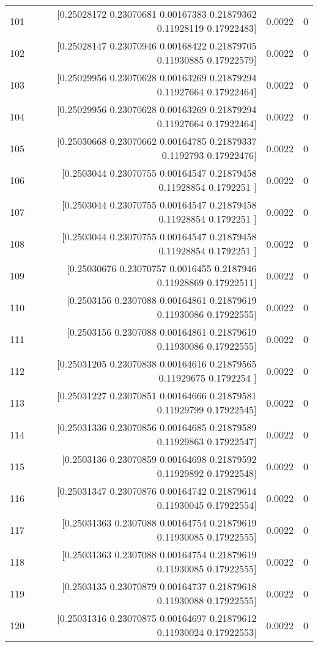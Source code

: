 \begin{longtable}{lrrr}
101 & [0.25028172 0.23070681 0.00167383 0.21879362 0.11928119 0.17922483] & 0.0022 & 0 \\
102 & [0.25028147 0.23070946 0.00168422 0.21879705 0.11930885 0.17922579] & 0.0022 & 0 \\
103 & [0.25029956 0.23070628 0.00163269 0.21879294 0.11927664 0.17922464] & 0.0022 & 0 \\
104 & [0.25029956 0.23070628 0.00163269 0.21879294 0.11927664 0.17922464] & 0.0022 & 0 \\
105 & [0.25030668 0.23070662 0.00164785 0.21879337 0.1192793  0.17922476] & 0.0022 & 0 \\
106 & [0.2503044  0.23070755 0.00164547 0.21879458 0.11928854 0.1792251 ] & 0.0022 & 0 \\
107 & [0.2503044  0.23070755 0.00164547 0.21879458 0.11928854 0.1792251 ] & 0.0022 & 0 \\
108 & [0.2503044  0.23070755 0.00164547 0.21879458 0.11928854 0.1792251 ] & 0.0022 & 0 \\
109 & [0.25030676 0.23070757 0.0016455  0.2187946  0.11928869 0.17922511] & 0.0022 & 0 \\
110 & [0.2503156  0.2307088  0.00164861 0.21879619 0.11930086 0.17922555] & 0.0022 & 0 \\
111 & [0.2503156  0.2307088  0.00164861 0.21879619 0.11930086 0.17922555] & 0.0022 & 0 \\
112 & [0.25031205 0.23070838 0.00164616 0.21879565 0.11929675 0.1792254 ] & 0.0022 & 0 \\
113 & [0.25031227 0.23070851 0.00164666 0.21879581 0.11929799 0.17922545] & 0.0022 & 0 \\
114 & [0.25031336 0.23070856 0.00164685 0.21879589 0.11929863 0.17922547] & 0.0022 & 0 \\
115 & [0.2503136  0.23070859 0.00164698 0.21879592 0.11929892 0.17922548] & 0.0022 & 0 \\
116 & [0.25031347 0.23070876 0.00164742 0.21879614 0.11930045 0.17922554] & 0.0022 & 0 \\
117 & [0.25031363 0.2307088  0.00164754 0.21879619 0.11930085 0.17922555] & 0.0022 & 0 \\
118 & [0.25031363 0.2307088  0.00164754 0.21879619 0.11930085 0.17922555] & 0.0022 & 0 \\
119 & [0.2503135  0.23070879 0.00164737 0.21879618 0.11930088 0.17922555] & 0.0022 & 0 \\
120 & [0.25031316 0.23070875 0.00164697 0.21879612 0.11930024 0.17922553] & 0.0022 & 0 \\

\end{longtable}
